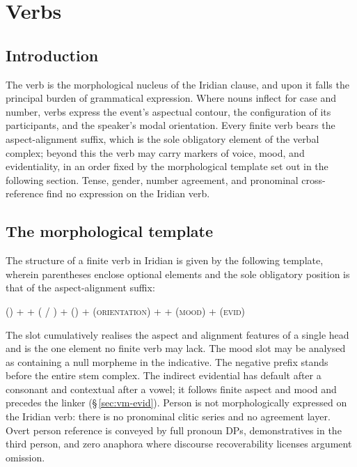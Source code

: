 \chapter{Verbs}\label{ch:verbs}

\section{Introduction}

The verb is the morphological nucleus of the Iridian clause, and upon it falls
the principal burden of grammatical expression. Where nouns inflect for case and number, verbs
express the event's aspectual contour, the configuration of its participants,
and the speaker's modal orientation. Every finite verb bears the aspect-alignment suffix,
which is the sole obligatory element of the verbal complex; beyond this the verb
may carry markers of voice, mood, and evidentiality, in an order fixed by the
morphological template set out in the following section. Tense, gender, number
agreement, and pronominal cross-reference find no expression on the Iridian
verb.

\section{The morphological template}\label{sec:morph-template}

The structure of a finite verb in Iridian is given by the following template,
wherein parentheses enclose optional elements and the sole obligatory position
is that of the aspect-alignment suffix:

\medskip
\begin{center}
(\Neg{}) + \Stem{} + (\Antip{} / \Appl{}) + (\Caus{}) + (\textsc{orientation}) +  + (\textsc{mood}) + (\textsc{evid})
\end{center}
\medskip

The  slot cumulatively realises the aspect and alignment
features of a single head and is the one element no finite verb may lack.
The mood slot may be analysed as containing a null morpheme in the indicative. The negative prefix 
stands before the entire stem complex. The indirect evidential has default
 after a consonant and contextual  after a vowel;
it follows finite aspect and mood and precedes the linker
(§\,\ref{sec:vm-evid}). Person is not morphologically expressed on the Iridian
verb: there is no pronominal clitic series and no agreement layer. Overt person
reference is conveyed by full pronoun DPs, demonstratives in the third person,
and zero anaphora where discourse recoverability licenses argument omission.


